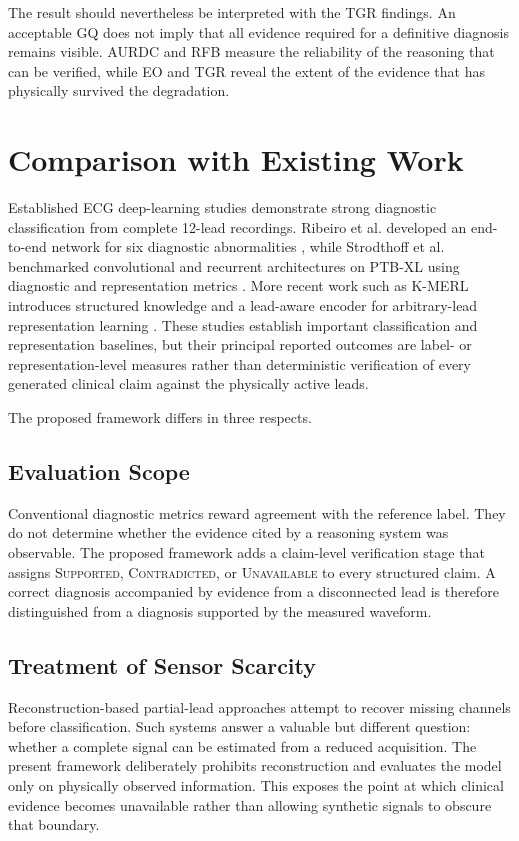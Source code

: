 \documentclass{ssnreview}
\begin{document}
The result should nevertheless be interpreted with the TGR findings. An acceptable GQ
does not imply that all evidence required for a definitive diagnosis remains visible.
AURDC and RFB measure the reliability of the reasoning that can be verified, while EO
and TGR reveal the extent of the evidence that has physically survived the degradation.

\section{Comparison with Existing Work}

Established ECG deep-learning studies demonstrate strong diagnostic classification from
complete 12-lead recordings. Ribeiro et al. developed an end-to-end network for six
diagnostic abnormalities \cite{ribeiro2020}, while Strodthoff et al. benchmarked
convolutional and recurrent architectures on PTB-XL using diagnostic and representation
metrics \cite{strodthoff2021}. More recent work such as K-MERL introduces structured
knowledge and a lead-aware encoder for arbitrary-lead representation learning
\cite{kmerl2025}. These studies establish important classification and representation
baselines, but their principal reported outcomes are label- or representation-level
measures rather than deterministic verification of every generated clinical claim against
the physically active leads.

The proposed framework differs in three respects.

\subsection{Evaluation Scope}

Conventional diagnostic metrics reward agreement with the reference label. They do not
determine whether the evidence cited by a reasoning system was observable. The proposed
framework adds a claim-level verification stage that assigns
\textsc{Supported}, \textsc{Contradicted}, or \textsc{Unavailable} to every structured
claim. A correct diagnosis accompanied by evidence from a disconnected lead is therefore
distinguished from a diagnosis supported by the measured waveform.

\subsection{Treatment of Sensor Scarcity}

Reconstruction-based partial-lead approaches attempt to recover missing channels before
classification. Such systems answer a valuable but different question: whether a complete
signal can be estimated from a reduced acquisition. The present framework deliberately
prohibits reconstruction and evaluates the model only on physically observed information.
This exposes the point at which clinical evidence becomes unavailable rather than allowing
synthetic signals to obscure that boundary.
\end{document}
